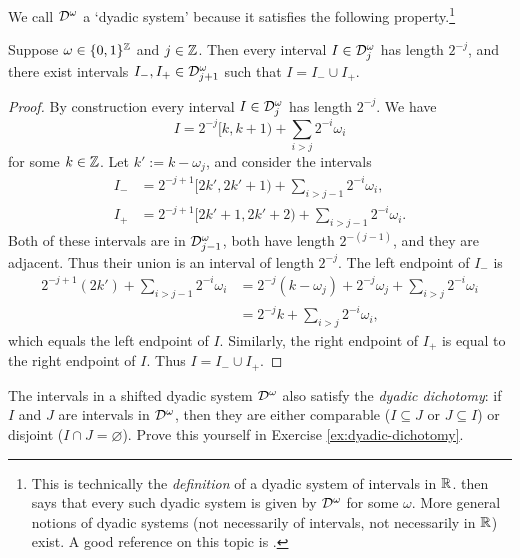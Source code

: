 We call $\mathcal{D}^{\omega}$ a `dyadic system' because it satisfies the following property.\footnote{This is technically the \emph{definition} of a dyadic system of intervals in $\mathbb{R}$. \cite[Lemma 5.1.7]{HNVW16} then says that every such dyadic system is given by $\mathcal{D}^\omega$ for some $\omega$. More general notions of dyadic systems (not necessarily of intervals, not necessarily in $\mathbb{R}$) exist. A good reference on this topic is \cite{LN18}.}

\begin{prop}
  Suppose $\omega \in \{0,1\}^{\mathbb{Z}}$ and $j \in \mathbb{Z}$.
  Then every interval $I \in \mathcal{D}_{j}^{\omega}$ has length $2^{-j}$, and there exist intervals $I_{-}, I_{+} \in \mathcal{D}^{\omega}_{j+1}$ such that $I = I_{-} \cup I_{+}$.
\end{prop}

\begin{proof}
  By construction every interval $I \in \mathcal{D}_{j}^{\omega}$ has length $2^{-j}$.
  We have
  \begin{equation*}
    I = 2^{-j}[k,k+1) + \sum_{i > j} 2^{-i} \omega_{i}
  \end{equation*}
  for some $k \in \mathbb{Z}$.
  Let $k' := k - \omega_{j}$, and consider the intervals
  \begin{equation*}
    \begin{aligned}
      I_{-} &= 2^{-{j+1}}[2k', 2k'+1) + \sum_{i > j-1} 2^{-i} \omega_{i}, \\
      I_{+} &= 2^{-{j+1}}[2k'+1, 2k'+2) + \sum_{i > j-1} 2^{-i} \omega_{i}. 
    \end{aligned}
  \end{equation*}
  Both of these intervals are in $\mathcal{D}^{\omega}_{j-1}$, both have length $2^{-(j-1)}$, and they are adjacent.
  Thus their union is an interval of length $2^{-j}$.
  The left endpoint of $I_{-}$ is
  \begin{equation*}
    \begin{aligned}
    2^{-j+1}(2k') + \sum_{i > j-1} 2^{-i} \omega_{i}
    &= 2^{-j}(k - \omega_{j}) + 2^{-j} \omega_{j} + \sum_{i > j} 2^{-i} \omega_{i} \\
    &= 2^{-j}k + \sum_{i > j} 2^{-i} \omega_{i},
  \end{aligned}
  \end{equation*}
  which equals the left endpoint of $I$.
  Similarly, the right endpoint of $I_{+}$ is equal to the right endpoint of $I$.
  Thus $I = I_{-} \cup I_{+}$.
\end{proof}

\begin{rmk}
The intervals in a shifted dyadic system $\mathcal{D}^{\omega}$ also satisfy the \emph{dyadic dichotomy}: if $I$ and $J$ are intervals in $\mathcal{D}^{\omega}$, then they are either comparable ($I \subseteq J$ or $J \subseteq I$) or disjoint ($I \cap J = \varnothing$).
Prove this yourself in Exercise \ref{ex:dyadic-dichotomy}.
\end{rmk}

